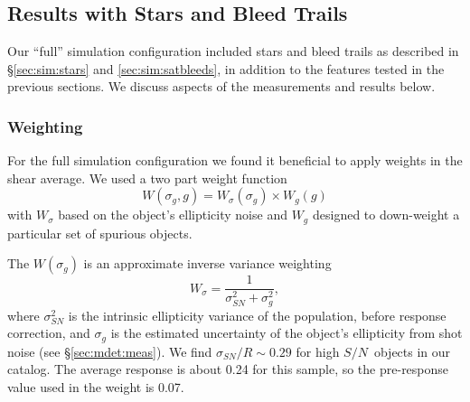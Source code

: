 \documentclass[twocolumn,twocolappendix,astrosym]{openjournal}
\newcommand{\snr}{$S/N$}
\begin{document}
\subsection{Results with Stars and Bleed Trails} \label{sec:results:full}

Our ``full'' simulation configuration included stars and bleed trails as
described in \S \ref{sec:sim:stars} and \ref{sec:sim:satbleeds}, in addition to
the features tested in the previous sections.  We discuss aspects of the
measurements and results below.

\subsubsection{Weighting}

For the full simulation configuration we found it beneficial to apply weights
in the shear average.  We used a two part weight function
\begin{equation}
    W(\sigma_g, g) = W_\sigma (\sigma_g) \times W_g(g)
\end{equation}
with $W_\sigma$ based on the object's ellipticity noise and $W_g$ designed to
down-weight a particular set of spurious objects.

The $W(\sigma_g)$ is an approximate inverse variance weighting
\begin{equation} \label{eq:wsigma}
    W_\sigma = \frac{1}{\sigma_{SN}^2 + \sigma_g^2},
\end{equation}
where $\sigma^2_{SN}$ is the intrinsic ellipticity variance of the population,
before response correction, and $\sigma_g$ is the estimated uncertainty of the
object's ellipticity from shot noise (see \S \ref{sec:mdet:meas}).  We find
$\sigma_{SN}/R \sim 0.29$ for high \snr\ objects in our catalog.  The average
response is about 0.24 for this sample, so the pre-response value used
in the weight is 0.07.
\end{document}
